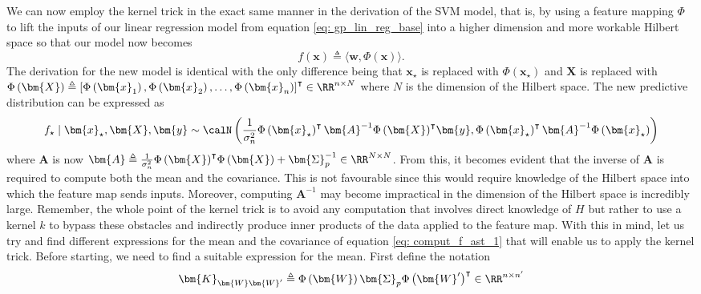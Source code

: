 We can now employ the kernel trick in the exact same manner in the derivation of the SVM model, that is, by using a feature mapping $\Phi$ to lift the inputs of our linear regression model from equation \ref{eq: gp_lin_reg_base} into a higher dimension and more workable Hilbert space so that our model now becomes
\begin{equation*} \label{eq: gp_lin_reg_feat_map}
    f \left( \bm{x} \right) \triangleq \langle \bm{w} , \Phi \left( \bm{x} \right) \rangle.
\end{equation*}
The derivation for the new model is identical with the only difference being that $\bm{x}_{\star}$ is replaced with $\Phi \left( \bm{x}_{\star} \right)$ and $\bm{X}$ is replaced with $\Phi \left( \bm{X} \right) \triangleq \left[ \Phi \left( \bm{x}_1 \right), \Phi \left( \bm{x}_2 \right) , \ldots , \Phi \left( \bm{x}_n \right) \right]^{\intercal} \in \RR^{n \times N}$ where $N$ is the dimension of the Hilbert space. The new predictive distribution can be expressed as
\begin{equation} \label{eq: comput_f_ast_1}
    f_{\star} \mid \bm{x}_{\star} , \bm{X} , \bm{y} \sim \calN \left( \frac{1}{\sigma_n^2} \Phi \left( \bm{x}_{\star} \right)^{\intercal} \bm{A}^{-1} {\Phi \left( \bm{X} \right)}^{\intercal} \bm{y} , \Phi \left( \bm{x}_{\star} \right)^{\intercal} \bm{A}^{-1} \Phi \left( \bm{x}_{\star} \right) \right)
\end{equation}
where $\bm{A}$ is now $\bm{A} \triangleq \frac{1}{\sigma_n^2} {\Phi \left( \bm{X} \right)}^{\intercal} \Phi \left( \bm{X} \right) + \bm{\Sigma}_p^{-1} \in \RR^{N \times N}$. From this, it becomes evident that the inverse of $\bm{A}$ is required to compute both the mean and the covariance. This is not favourable since this would require knowledge of the Hilbert space into which the feature map sends inputs. Moreover, computing $\bm{A}^{-1}$ may become impractical in the dimension of the Hilbert space is incredibly large. Remember, the whole point of the kernel trick is to avoid any computation that involves direct knowledge of $H$ but rather to use a kernel $k$ to bypass these obstacles and indirectly produce inner products of the data applied to the feature map. With this in mind, let us try and find different expressions for the mean and the covariance of equation \ref{eq: comput_f_ast_1} that will enable us to apply the kernel trick. Before starting, we need to find a suitable expression for the mean. First define the notation
\[
    \bm{K}_{\bm{W} \bm{W}'} \triangleq \Phi \left( \bm{W} \right) \bm{\Sigma}_p {\Phi \left( \bm{W}' \right)}^{\intercal} \in \RR^{n \times n'}
\]
